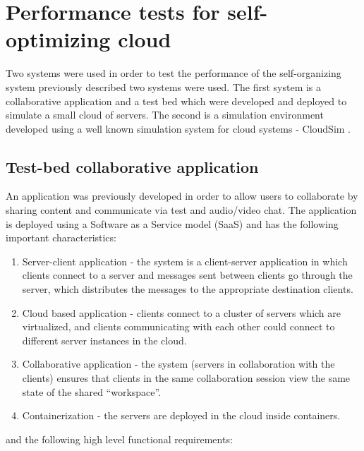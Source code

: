 \chapter{Performance tests for self-optimizing cloud} %
\label{Chapter_testbed}

Two systems were used in order to test the performance of the self-organizing system previously described two systems were used. The first system is a collaborative application and a test bed which were developed and deployed to simulate a small cloud of servers. The second is a simulation environment developed using a well known simulation system for cloud systems - CloudSim \cite{related:cloudsim}. 

\section{Test-bed collaborative application}

An application was previously developed \cite{bogdan:miles2012chapter} in order to allow users to collaborate by sharing content and communicate via test and audio/video chat. The application is deployed using a Software as a Service model (SaaS) and has the following important characteristics:

\begin{enumerate}
	\item Server-client application - the system is a client-server application in which clients connect to a server and messages sent between clients go through the server, which distributes the messages to the appropriate destination clients.
	\item Cloud based application - clients connect to a cluster of servers which are virtualized, and clients communicating with each other could connect to different server instances in the cloud.
	\item Collaborative application - the system (servers in collaboration with the clients) ensures that clients in the same collaboration session view the same state of the shared ``workspace''. 
	\item Containerization - the servers are deployed in the cloud inside containers.
\end{enumerate}

and the following high level functional requirements:

